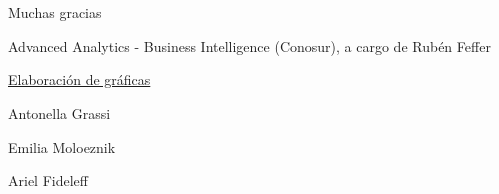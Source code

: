 \documentclass[aspectratio=169]{beamer}
\begin{document}
    \section*{}
    \begin{frame}
        \begin{center}
            \LARGE
            Muchas gracias \vspace{4pt}

            \small
            Advanced Analytics - Business Intelligence (Conosur), a cargo de Rubén Feffer\vspace{12pt}\pause

            \scriptsize
            \underline{Elaboración de gráficas}

            Antonella Grassi

            Emilia Moloeznik

            Ariel Fideleff
        \end{center}
    \end{frame}
\end{document}
